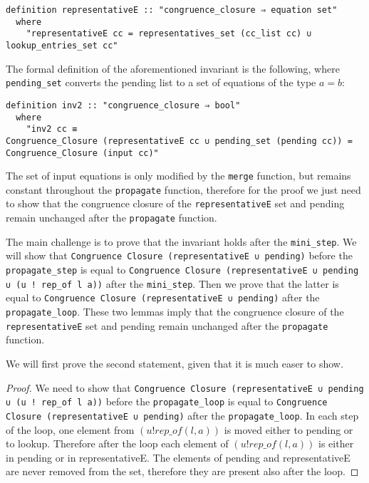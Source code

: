 \begin{lstlisting}
definition representativeE :: "congruence_closure ⇒ equation set"
  where
    "representativeE cc = representatives_set (cc_list cc) ∪ lookup_entries_set cc"
\end{lstlisting}

The formal definition of the aforementioned invariant is the following, where \lstinline{pending_set} converts the pending list to a set of equations of the type $a = b$:

\begin{lstlisting}
definition inv2 :: "congruence_closure ⇒ bool"
  where
    "inv2 cc ≡
Congruence_Closure (representativeE cc ∪ pending_set (pending cc)) = Congruence_Closure (input cc)"
\end{lstlisting}

The set of input equations is only modified by the \lstinline{merge} function, but remains constant throughout the \lstinline{propagate} function, therefore for the proof we just need to show that the congruence closure of the \lstinline{representativeE} set and pending remain unchanged after the \lstinline{propagate} function.

The main challenge is to prove that the invariant holds after the \lstinline{mini_step}. We will show that \lstinline{Congruence Closure (representativeE ∪ pending)} before the \lstinline{propagate_step} is equal to \lstinline{Congruence Closure (representativeE ∪ pending ∪ (u ! rep_of l a))} after the \lstinline{mini_step}.
Then we prove that the latter is equal to \lstinline{Congruence Closure (representativeE ∪ pending)}  after the \lstinline{propagate_loop}.
These two lemmas imply that the congruence closure of the \lstinline{representativeE} set and pending remain unchanged after the \lstinline{propagate} function.

We will first prove the second statement, given that it is much easer to show.

\begin{proof}
We need to show that \lstinline{Congruence Closure (representativeE ∪ pending ∪ (u ! rep_of l a))} before the \lstinline{propagate_loop} is equal to \lstinline{Congruence Closure (representativeE ∪ pending)}  after the \lstinline{propagate_loop}. In each step of the loop, one element from $(u ! rep\_of(l, a))$ is moved either to pending or to lookup. Therefore after the loop each element of $(u ! rep\_of(l, a))$ is either in pending or in representativeE. The elements of pending and representativeE are never removed from the set, therefore they are present also after the loop.
\end{proof}


